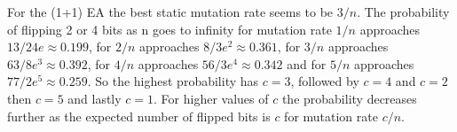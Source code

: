 For the (1+1) EA the best static mutation rate seems to be $3/n$. 
The probability of flipping 2 or 4 bits as n goes to infinity for mutation rate $1/n$ approaches $13/24e\approx 0.199$, for $2/n$ approaches $8/3e^2\approx 0.361$, for $3/n$ approaches $63/8e^3\approx 0.392$, for $4/n$ approaches $56/3e^4\approx 0.342$ and for $5/n$ approaches $77/2e^5\approx 0.259$. So the highest probability has $c=3$, followed by $c=4$ and $c=2$ then $c=5$ and lastly $c=1$. For higher values of $c$ the probability decreases further as the expected number of flipped bits is $c$ for mutation rate $c/n$.